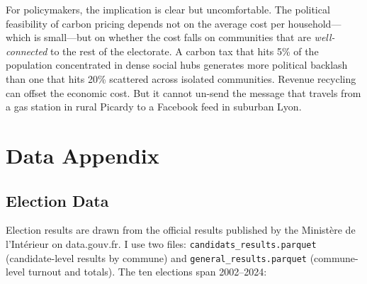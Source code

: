 \documentclass[12pt]{article}
\begin{document}
For policymakers, the implication is clear but uncomfortable. The political feasibility of carbon pricing depends not on the average cost per household---which is small---but on whether the cost falls on communities that are \emph{well-connected} to the rest of the electorate. A carbon tax that hits 5\% of the population concentrated in dense social hubs generates more political backlash than one that hits 20\% scattered across isolated communities. Revenue recycling can offset the economic cost. But it cannot un-send the message that travels from a gas station in rural Picardy to a Facebook feed in suburban Lyon.

\label{apep_main_text_end}






\clearpage
\appendix
\setcounter{table}{0}
\renewcommand{\thetable}{A\arabic{table}}
\setcounter{figure}{0}
\renewcommand{\thefigure}{A\arabic{figure}}

\section{Data Appendix}
\label{app:data}

\subsection{Election Data}

Election results are drawn from the official results published by the Minist\`{e}re de l'Int\'{e}rieur on data.gouv.fr. I use two files: \texttt{candidats\_results.parquet} (candidate-level results by commune) and \texttt{general\_results.parquet} (commune-level turnout and totals). The ten elections span 2002--2024:
\end{document}
